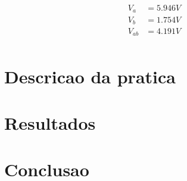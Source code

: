 \documentclass[12pt,twoside, a4paper, twocolumn]{article}
\begin{document}
\begin{equation*}
    \begin{aligned}
        V_{a}  & = 5.946V \\
        V_{b}  & = 1.754V \\
        V_{ab} & = 4.191V \\
    \end{aligned}
\end{equation*}


\section{Descricao da pratica}

\section{Resultados}

\section{Conclusao}
\end{document}
